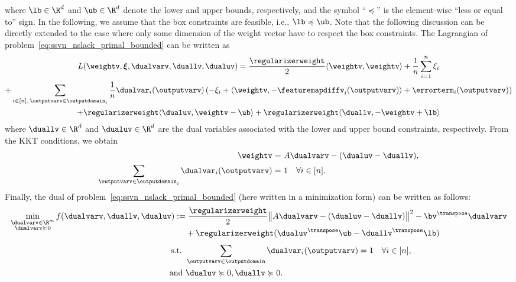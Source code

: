 \documentclass{article}
\begin{document}
where $\lb \in \R^d$ and $\ub \in \R^d$ denote the lower and upper bounds, respectively, and the symbol ``$\preccurlyeq$'' is the element-wise ``less or equal to'' sign.
In the following, we assume that the box constraints are feasible, i.e., $\lb \preccurlyeq \ub$.
Note that the following discussion can be directly extended to the case where only some dimension of the weight vector have to respect the box constraints.
The Lagrangian of problem~\eqref{eq:ssvn_nslack_primal_bounded} can be written as
\begin{multline}
 \label{eq:ssvn_nslack_lagrang_bounded}
L(\weightv,\bm{\xi},\dualvarv, \duallv, \dualuv)
  = \frac\regularizerweight2 \langle\weightv,\weightv\rangle+\frac1n\sum_{i=1}^n \xi_i   \\
  + \sum_{i\in[n],\,\outputvarv \in \outputdomain_i}
  \frac1n\dualvar_i(\outputvarv)
  \left( -\xi_i +
     \langle \weightv, -\featuremapdiffv_i(\outputvarv) \rangle
     + \errorterm_i(\outputvarv)
  \right)  \\
  +\regularizerweight \langle \dualuv, \weightv - \ub \rangle + \regularizerweight \langle \duallv, -\weightv + \lb \rangle
\end{multline}
where $\duallv \in \R^d$ and  $\dualuv \in \R^d$ are the dual variables associated with the lower and upper bound constraints, respectively.
From the KKT conditions, we obtain
\begin{align}
\label{eq:kkt_box_w}
\weightv =& \ A\dualvarv-(\dualuv-\duallv), \\
\label{eq:kkt_box_alp}
\sum_{\outputvarv \in \outputdomain_i}
  \dualvar_i(\outputvarv) = & \ 1 ~~~\forall i\in[n].
\end{align}
Finally, the dual of problem~\eqref{eq:ssvn_nslack_primal_bounded} (here written in a minimization form) can be written as follows:
\begin{align}
\label{eq:ssvn_nslack_dual_bounded}
    \min_{\substack{ \dualvarv\in\R^{m} \\  \dualvarv \succcurlyeq 0}}  f(\dualvarv,\duallv,\dualuv) :=&  \;
    \frac{\regularizerweight}{2}
    \big\|A \dualvarv - (\dualuv - \duallv)\big\|^2 - \bv^\transpose \dualvarv \notag \\[-3mm]
    & + \regularizerweight ( \dualuv^{\transpose} \ub - \duallv^{\transpose} \lb )
    \notag \\[1mm]
    \text{s.t. } & \sum_{\outputvarv \in \outputdomain}  \dualvar_i(\outputvarv) = 1 ~~~ \forall i\in[n], \notag \\
      \text{and } & \dualuv \succcurlyeq 0 , \duallv \succcurlyeq 0.
\end{align}
\end{document}
